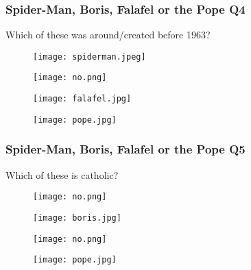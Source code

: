 \documentclass{beamer}
\begin{document}
\begin{frame}
\frametitle{Spider-Man, Boris, Falafel or the Pope Q4}
Which of these was around/created before 1963?
\begin{figure}[!htb]
    \centering
    \begin{minipage}{.5\textwidth}
        \centering
        \texttt{[image: spiderman.jpeg]}
        
    \end{minipage}%
    \begin{minipage}{0.5\textwidth}
        \centering
        \texttt{[image: no.png]}
        
    \end{minipage}
\end{figure}
\begin{figure}[!htb]
    \centering
    \begin{minipage}{.5\textwidth}
        \centering
        \texttt{[image: falafel.jpg]}
        
    \end{minipage}%
    \begin{minipage}{0.5\textwidth}
        \centering
        \texttt{[image: pope.jpg]}
        
    \end{minipage}
\end{figure}
\end{frame}


\begin{frame}
\frametitle{Spider-Man, Boris, Falafel or the Pope Q5}
Which of these is catholic?
\begin{figure}[!htb]
    \centering
    \begin{minipage}{.5\textwidth}
        \centering
        \texttt{[image: no.png]}
        
    \end{minipage}%
    \begin{minipage}{0.5\textwidth}
        \centering
        \texttt{[image: boris.jpg]}
        
    \end{minipage}
\end{figure}
\begin{figure}[!htb]
    \centering
    \begin{minipage}{.5\textwidth}
        \centering
        \texttt{[image: no.png]}
        
    \end{minipage}%
    \begin{minipage}{0.5\textwidth}
        \centering
        \texttt{[image: pope.jpg]}
        
    \end{minipage}
\end{figure}
\end{frame}
\end{document}
